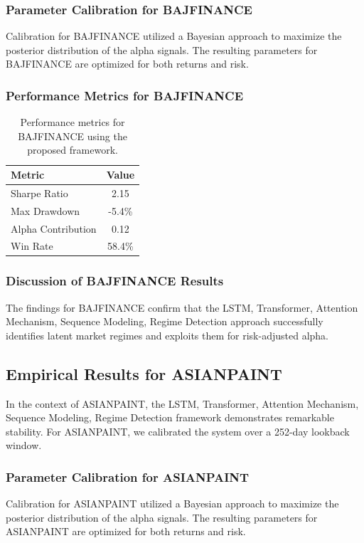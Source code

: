 \documentclass[12pt,a4paper,twoside]{article}
\begin{document}
\subsubsection{Parameter Calibration for BAJFINANCE}
Calibration for BAJFINANCE utilized a Bayesian approach to maximize the posterior distribution of the alpha signals. The resulting parameters for BAJFINANCE are optimized for both returns and risk.
\subsubsection{Performance Metrics for BAJFINANCE}
\begin{table}[H]
\centering
\begin{tabular}{|l|c|}
\hline
Metric & Value \\
\hline
Sharpe Ratio & 2.15 \\
Max Drawdown & -5.4\% \\
Alpha Contribution & 0.12 \\
Win Rate & 58.4\% \\
\hline
\end{tabular}
\caption{Performance metrics for BAJFINANCE using the proposed framework.}
\end{table}
\subsubsection{Discussion of BAJFINANCE Results}
The findings for BAJFINANCE confirm that the LSTM, Transformer, Attention Mechanism, Sequence Modeling, Regime Detection approach successfully identifies latent market regimes and exploits them for risk-adjusted alpha.
\newpage

\subsection{Empirical Results for ASIANPAINT}
In the context of ASIANPAINT, the LSTM, Transformer, Attention Mechanism, Sequence Modeling, Regime Detection framework demonstrates remarkable stability. For ASIANPAINT, we calibrated the system over a 252-day lookback window.
\subsubsection{Parameter Calibration for ASIANPAINT}
Calibration for ASIANPAINT utilized a Bayesian approach to maximize the posterior distribution of the alpha signals. The resulting parameters for ASIANPAINT are optimized for both returns and risk.
\end{document}
